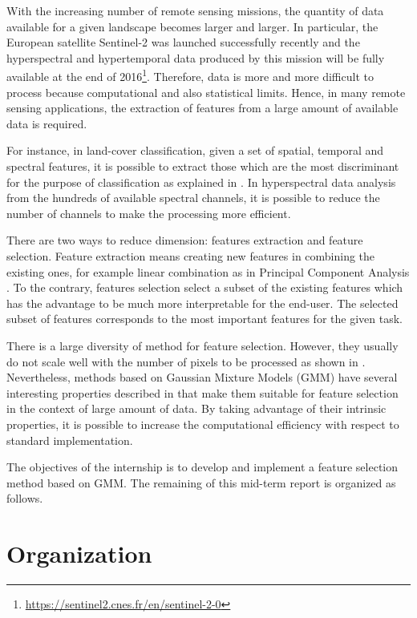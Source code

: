 \documentclass[a4paper,11pt,DIV=16]{scrartcl}
\begin{document}
With the increasing number of remote sensing missions, the quantity of data available for a given landscape becomes larger and larger. In particular, the European satellite Sentinel-2 was launched successfully recently and the hyperspectral and hypertemporal data produced by this mission will be fully available at the end of 2016\footnote{\url{https://sentinel2.cnes.fr/en/sentinel-2-0}}. Therefore, data is more and more difficult to process because computational and also statistical limits. Hence, in many remote sensing applications, the extraction of features from a large amount of available data is required.

For instance, in land-cover classification, given a set of spatial, temporal and spectral features, it is possible to extract those which are the most discriminant for the purpose of classification as explained in \cite{Guyon:2006:FEF:1208773}. In hyperspectral data analysis from the hundreds of available spectral channels, it is possible to reduce the number of channels to make the processing more efficient.

There are two ways to reduce dimension: features extraction and feature selection. Feature extraction means creating new features in combining the existing ones, for example linear combination as in Principal Component Analysis \cite{jimenez1998supervised}. To the contrary, features selection select a subset of the existing features which has the advantage to be much more interpretable for the end-user. The selected subset of features corresponds to the most important features for the given task.

There is a large diversity of method for feature selection. However, they usually do not scale well with the number of pixels to be processed as shown in \cite{fauvel2015fast}. Nevertheless, methods based on Gaussian Mixture Models (GMM) have several interesting properties described in \cite{webb2003statistical} that make them suitable for feature selection in the context of large amount of data. By taking advantage of their intrinsic properties, it is possible to increase the computational efficiency with respect to standard implementation.

The objectives of the internship is to develop and implement a feature selection method based on GMM. The remaining of this mid-term report is organized as follows.

\section{Organization}
\label{sec:orga}
\end{document}
